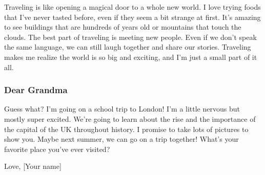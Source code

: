 \documentclass[]{article} %
\begin{document}
	Traveling is like opening a magical door to a whole new world. I love trying foods that I've never tasted before, even if they seem a bit strange at first. It's amazing to see buildings that are hundreds of years old or mountains that touch the clouds. The best part of traveling is meeting new people. Even if we don't speak the same language, we can still laugh together and share our stories. Traveling makes me realize the world is so big and exciting, and I'm just a small part of it all.
	
	
	
	\subsubsection*{Dear Grandma}
	
	Guess what? I'm going on a school trip to London! I'm a little nervous but mostly super excited. We're going to learn about the rise and the importance of the capital of the UK throughout history. I promise to take lots of pictures to show you. Maybe next summer, we can go on a trip together! What's your favorite place you've ever visited?
	
	Love,
	[Your name] \par 
	\vspace{1cm}
	
\end{document}
